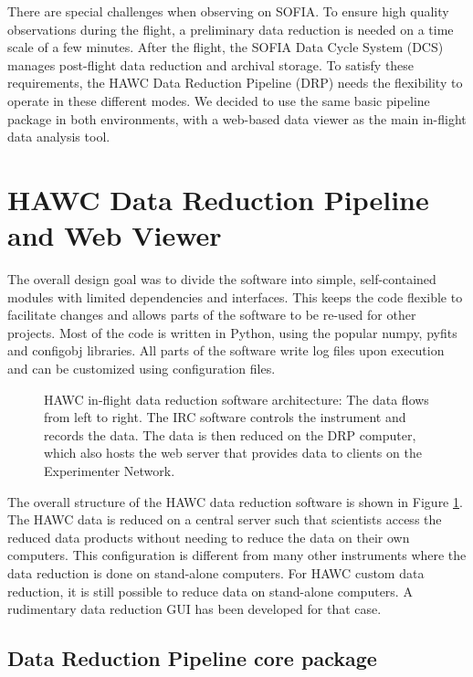 There are special challenges when observing on SOFIA. To ensure high
quality observations during the flight, a preliminary data reduction
is needed on a time scale of a few minutes. After the flight, the
SOFIA Data Cycle System (DCS) \citep[see][]{P050_adassxxii} manages
post-flight data reduction and archival storage. To satisfy these
requirements, the HAWC Data Reduction Pipeline (DRP) needs the
flexibility to operate in these different modes. We decided to use the
same basic pipeline package in both environments, with a web-based data
viewer as the main in-flight data analysis tool.

\section{HAWC Data Reduction Pipeline and Web Viewer}

The overall design goal was to divide the software into simple,
self-contained modules with limited dependencies and interfaces. This
keeps the code flexible to facilitate changes and allows parts of the
software to be re-used for other projects. Most of the code is written
in Python, using the popular numpy, pyfits and configobj
libraries. All parts of the software write log files upon execution
and can be customized using configuration files.

\begin{figure}

\caption{HAWC in-flight data reduction software architecture: The data
  flows from left to right. The IRC software controls the instrument
  and records the data. The data is then reduced on the DRP computer,
  which also hosts the web server that provides data to clients on the
  Experimenter Network.}

\label{fig_struct}

\end{figure}

The overall structure of the HAWC data reduction software is shown in
Figure \ref{fig_struct}. The HAWC data is reduced on a central server
such that scientists access the reduced data products without needing
to reduce the data on their own computers. This configuration is
different from many other instruments where the data reduction is done
on stand-alone computers. For HAWC custom data reduction, it is still
possible to reduce data on stand-alone computers. A rudimentary data
reduction GUI has been developed for that case.

\subsection{Data Reduction Pipeline core package}


